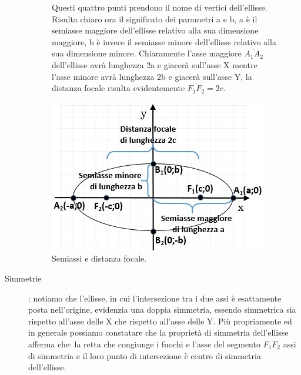 \begin{description}
\begin{figure}[h]
\begin{minipage}{.4\textwidth}
Questi quattro punti prendono il nome di vertici dell'ellisse. Risulta 
chiaro ora il significato dei parametri a e b, a è il semiasse maggiore 
dell'ellisse relativo alla sua dimensione maggiore, b è invece il semiasse 
minore dell'ellisse relativo alla sua dimensione minore. Chiaramente l'asse 
maggiore $\overline{A_{1}A_{2}}$ dell'ellisse avrà lunghezza 2a e giacerà 
sull'asse X mentre l'asse minore avrà lunghezza 2b e giacerà sull'asse Y, 
la distanza focale risulta evidentemente $\overline{F_{1}F_{2}}=2c$.
\end{minipage}
\hfill
\begin{minipage}{.53\textwidth}
\begin{center}
  \includegraphics[width=.9\textwidth]{img/semiassi.jpg}
  \caption{Semiassi e distanza focale.}
\end{center}
\end{minipage}
\end{figure}


\item [Simmetrie]: notiamo che l'ellisse, in cui l'intersezione tra i 
due assi è esattamente posta nell'origine, evidenzia una doppia simmetria, 
essendo simmetrica sia rispetto all'asse delle X che rispetto all'asse 
delle Y. Più propriamente ed in generale possiamo constatare che la 
proprietà di  simmetria dell'ellisse afferma che: la retta che congiunge i 
fuochi e l'asse del segmento $\overline{F_{1}F_{2}}$ assi di simmetria e il 
loro punto di intersezione è centro di simmetria dell'ellisse. 


\end{description}
